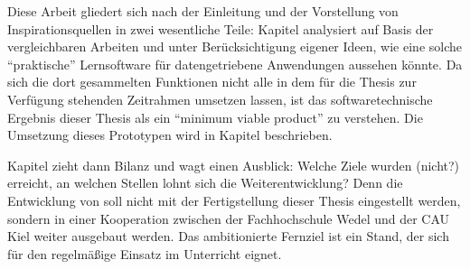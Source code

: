 Diese Arbeit gliedert sich nach der Einleitung und der Vorstellung von Inspirationsquellen in zwei wesentliche Teile: Kapitel  analysiert auf Basis der vergleichbaren Arbeiten und unter Berücksichtigung eigener Ideen, wie eine solche "`praktische"' Lernsoftware für datengetriebene Anwendungen aussehen könnte. Da sich die dort gesammelten Funktionen nicht alle in dem für die Thesis zur Verfügung stehenden Zeitrahmen umsetzen lassen, ist das softwaretechnische Ergebnis dieser Thesis als ein "`minimum viable product"' zu verstehen. Die Umsetzung dieses Prototypen wird in Kapitel  beschrieben.

Kapitel  zieht dann Bilanz und wagt einen Ausblick: Welche Ziele wurden (nicht?) erreicht, an welchen Stellen lohnt sich die Weiterentwicklung? Denn die Entwicklung von \idename{} soll nicht mit der Fertigstellung dieser Thesis eingestellt werden, sondern in einer Kooperation zwischen der Fachhochschule Wedel und der CAU Kiel weiter ausgebaut werden. Das ambitionierte Fernziel ist ein Stand, der sich für den regelmäßige Einsatz im Unterricht eignet.


